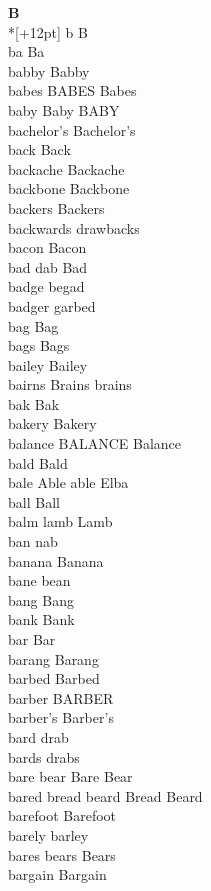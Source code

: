\vspace{14pt}
\noindent\textbf{\Large B}\\*[+12pt]
b B\\
ba Ba\\
babby Babby\\
babes BABES Babes\\
baby Baby BABY\\
bachelor's Bachelor's\\
back Back\\
backache Backache\\
backbone Backbone\\
backers Backers\\
backwards drawbacks\\
bacon Bacon\\
bad dab Bad\\
badge begad\\
badger garbed\\
bag Bag\\
bags Bags\\
bailey Bailey\\
bairns Brains brains\\
bak Bak\\
bakery Bakery\\
balance BALANCE Balance\\
bald Bald\\
bale Able able Elba\\
ball Ball\\
balm lamb Lamb\\
ban nab\\
banana Banana\\
bane bean\\
bang Bang\\
bank Bank\\
bar Bar\\
barang Barang\\
barbed Barbed\\
barber BARBER\\
barber's Barber's\\
bard drab\\
bards drabs\\
bare bear Bare Bear\\
bared bread beard Bread Beard\\
barefoot Barefoot\\
barely barley\\
bares bears Bears\\
bargain Bargain\\
